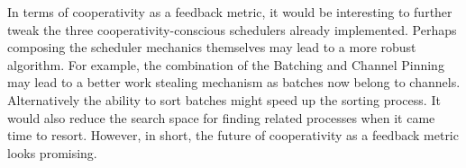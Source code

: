 In terms of cooperativity as a feedback metric, it would be interesting to further
tweak the three cooperativity-conscious schedulers already implemented. Perhaps 
composing the scheduler mechanics themselves may lead to a more robust algorithm.
For example, the combination of the Batching and Channel Pinning may lead to a better
work stealing mechanism as batches now belong to channels. Alternatively the ability
to sort batches might speed up the sorting process. It would also reduce the search
space for finding related processes when it came time to resort. However, in short, 
the future of cooperativity as a feedback metric looks promising.

